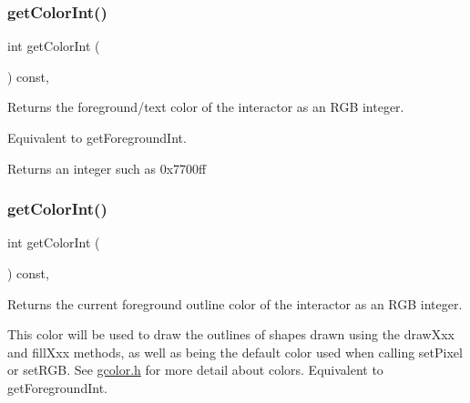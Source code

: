 \subsubsection{\texorpdfstring{get\+Color\+Int()}{getColorInt()}\hspace{0.1cm}{\footnotesize\ttfamily [1/2]}}
{\footnotesize\ttfamily int get\+Color\+Int (\begin{DoxyParamCaption}{ }\end{DoxyParamCaption}) const\hspace{0.3cm}{\ttfamily [virtual]}, {\ttfamily [inherited]}}



Returns the foreground/text color of the interactor as an R\+GB integer. 

Equivalent to get\+Foreground\+Int. \begin{DoxyReturn}{Returns}
an integer such as 0x7700ff 
\end{DoxyReturn}
\mbox{\label{classGDrawingSurface_a9635c7af766cdc3417f346683fa0e6c1}} 
\subsubsection{\texorpdfstring{get\+Color\+Int()}{getColorInt()}\hspace{0.1cm}{\footnotesize\ttfamily [2/2]}}
{\footnotesize\ttfamily int get\+Color\+Int (\begin{DoxyParamCaption}{ }\end{DoxyParamCaption}) const\hspace{0.3cm}{\ttfamily [virtual]}, {\ttfamily [inherited]}}



Returns the current foreground outline color of the interactor as an R\+GB integer. 

This color will be used to draw the outlines of shapes drawn using the draw\+Xxx and fill\+Xxx methods, as well as being the default color used when calling set\+Pixel or set\+R\+GB. See \mbox{\hyperlink{gcolor_8h_source}{gcolor.\+h}} for more detail about colors. Equivalent to get\+Foreground\+Int. \mbox{\label{classGInteractor_a7a6e317c29d61030929b4cd2d1c00fe7}} 
